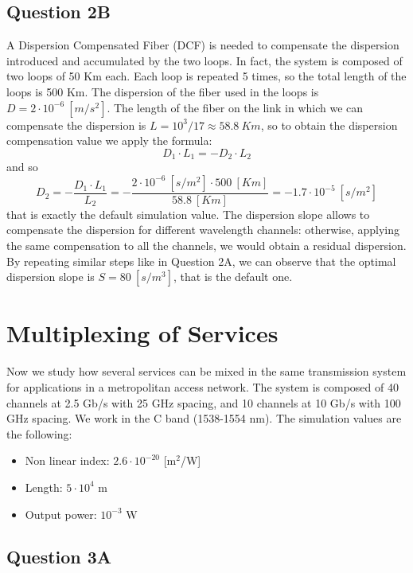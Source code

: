 \documentclass[a4paper,10pt]{report}
\begin{document}
\subsection*{Question 2B}
A Dispersion Compensated Fiber (DCF) is needed to compensate the dispersion introduced and accumulated by the two loops.
In fact, the system is composed of two loops of 50 Km each. Each loop is repeated 5 times, so the total length of the loops
is 500 Km. The dispersion of the fiber used in the loops is $D=2 \cdot 10^{-6} \ [m/s^2]$.
The length of the fiber on the link in which we can compensate the dispersion is $L=10^3/17\approx 58.8 \ Km$, so to obtain the dispersion 
compensation value we apply the formula: $$ D_1 \cdot L_1 = - D_2 \cdot L_2$$
and so $$D_2=-\frac{D_1 \cdot L_1}{L_2}= -\frac{2 \cdot 10^{-6} \ [s/m^2] \cdot 500 \ [Km]}{58.8 \ [Km]}=-1.7 \cdot 10^{-5} \ [s/m^2]$$
that is exactly the default simulation value.
The dispersion slope allows to compensate the dispersion for different wavelength channels: otherwise, applying the same compensation
to all the channels, we would obtain a residual dispersion.
By repeating similar steps like in Question 2A, we can observe that the optimal dispersion slope is $S=80 \ [s/m^3]$, that is the default one.

\newpage
\section*{Multiplexing of Services}

Now we study how several services can be mixed in the same transmission system for applications in a metropolitan access network.
The system is composed of 40 channels at 2.5 Gb/s with 25 GHz spacing, and 10 channels at 10 Gb/s with 100 GHz spacing.
We work in the C band (1538-1554 nm).
The simulation values are the following:

\begin{itemize}
 \item Non linear index: $2.6 \cdot 10^{-20} $ [m$^2$/W]
 \item Length: $5 \cdot 10^{4}$ m
 \item Output power: $10^{-3}$ W
\end{itemize}


\subsection*{Question 3A}
\end{document}
